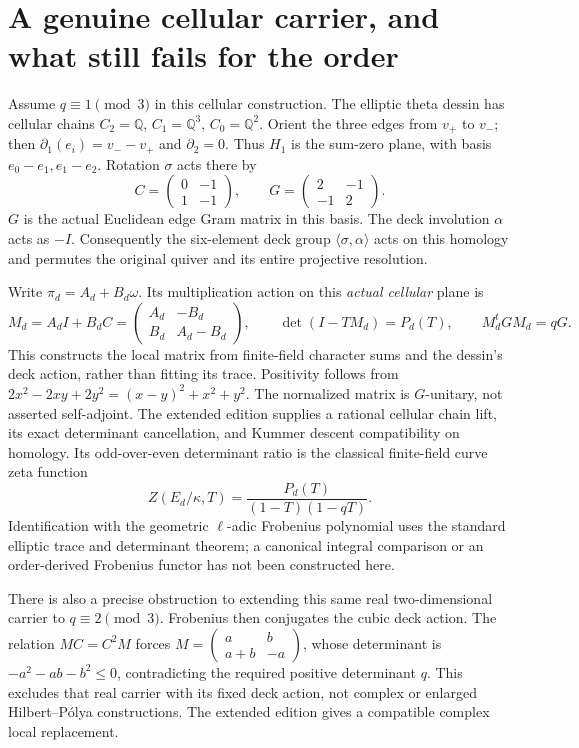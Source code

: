 \documentclass[11pt,oneside,openany]{book}
\theoremstyle{definition}\newtheorem{definition}[theorem]{Definition}
\theoremstyle{remark}\newtheorem{remark}[theorem]{Remark}
\begin{document}
\section{A genuine cellular carrier, and what still fails for the order}
Assume $q\equiv1\pmod3$ in this cellular construction. The elliptic theta dessin has cellular chains $C_2=\mathbb{Q}$, $C_1=\mathbb{Q}^3$, $C_0=\mathbb{Q}^2$. Orient the three edges from $v_+$ to $v_-$; then $\partial_1(e_i)=v_--v_+$ and $\partial_2=0$. Thus $H_1$ is the sum-zero plane, with basis $e_0-e_1,e_1-e_2$. Rotation $\sigma$ acts there by
\[
 C=\begin{pmatrix}0&-1\\1&-1\end{pmatrix},\qquad
 G=\begin{pmatrix}2&-1\\-1&2\end{pmatrix}.
\]
$G$ is the actual Euclidean edge Gram matrix in this basis. The deck involution $\alpha$ acts as $-I$. Consequently the six-element deck group $\langle\sigma,\alpha\rangle$ acts on this homology and permutes the original quiver and its entire projective resolution.

Write $\pi_d=A_d+B_d\omega$. Its multiplication action on this \emph{actual cellular} plane is
\[
 M_d=A_dI+B_dC=\begin{pmatrix}A_d&-B_d\\B_d&A_d-B_d\end{pmatrix},\qquad
 \det(I-TM_d)=P_d(T),\qquad M_d^tGM_d=qG.
\]
This constructs the local matrix from finite-field character sums and the dessin's deck action, rather than fitting its trace. Positivity follows from $2x^2-2xy+2y^2=(x-y)^2+x^2+y^2$. The normalized matrix is $G$-unitary, not asserted self-adjoint. The extended edition supplies a rational cellular chain lift, its exact determinant cancellation, and Kummer descent compatibility on homology. Its odd-over-even determinant ratio is the classical finite-field curve zeta function
\[
 Z(E_d/\kappa,T)=\frac{P_d(T)}{(1-T)(1-qT)}.
\]
Identification with the geometric $\ell$-adic Frobenius polynomial uses the standard elliptic trace and determinant theorem; a canonical integral comparison or an order-derived Frobenius functor has not been constructed here.

There is also a precise obstruction to extending this same real two-dimensional carrier to $q\equiv2\pmod3$. Frobenius then conjugates the cubic deck action. The relation $MC=C^2M$ forces $M=\left(\begin{smallmatrix}a&b\\a+b&-a\end{smallmatrix}\right)$, whose determinant is $-a^2-ab-b^2\le0$, contradicting the required positive determinant $q$. This excludes that real carrier with its fixed deck action, not complex or enlarged Hilbert--P\'olya constructions. The extended edition gives a compatible complex local replacement.
\end{document}
